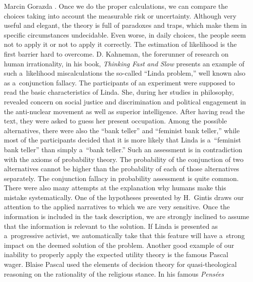 \begin{artengenv}{Marcin Gorazda}
{%
\parencite[][]{von_neumann_theory_1944}.%
} Once we do the proper calculations, we can compare the choices taking into account the measurable risk or uncertainty. Although very useful and elegant, the theory is full of paradoxes and traps, which make them in specific circumstances undecidable. Even worse, in daily choices, the people seem not to apply it or not to apply it correctly. The estimation of likelihood is the first barrier hard to overcome. D. Kahneman, the forerunner of research on human irrationality, in his book, \textit{Thinking Fast and Slow} 
\parencite*[][]{kahneman_thinking_2011} %
 presents an example of such a~likelihood miscalculations the so-called ``Linda problem,'' well known also as a~conjunction fallacy. The participants of an experiment were supposed to read the basic characteristics of Linda. She, during her studies in philosophy, revealed concern on social justice and discrimination and political engagement in the anti-nuclear movement as well as superior intelligence. After having read the text, they were asked to guess her present occupation. Among the possible alternatives, there were also the ``bank teller'' and ``feminist bank teller,'' while most of the participants decided that it is more likely that Linda is a~``feminist bank teller'' than simply a~``bank teller.'' Such an assessment is in contradiction with the axioms of probability theory. The probability of the conjunction of two alternatives cannot be higher than the probability of each of those alternatives separately. The conjunction fallacy in probability assessment is quite common. There were also many attempts at the explanation why humans make this mistake systematically. One of the hypotheses presented by H.~Gintis 
\parencite*[][]{gintis_evolutionary_2012} %
 draws our attention to the applied narratives to which we are very sensitive. Once the information is included in the task description, we are strongly inclined to assume that the information is relevant to the solution. If Linda is presented as a~progressive activist, we automatically take that this feature will have a~strong impact on the deemed solution of the problem. Another good example of our inability to properly apply the expected utility theory is the famous Pascal wager. Blaise Pascal used the elements of decision theory for quasi-theological reasoning on the rationality of the religious stance. In his famous \textit{Pensées} 

\end{artengenv}
